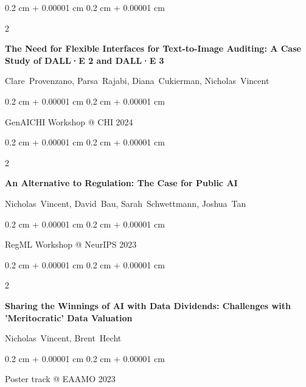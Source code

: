 \documentclass[10pt, letterpaper]{article}
\newenvironment{onecolentry}{
    \begin{adjustwidth}{
        0.2 cm + 0.00001 cm
    }{
        0.2 cm + 0.00001 cm
    }
}{
    \end{adjustwidth}
} %
\newenvironment{twocolentry}[2][]{
    \onecolentry
    \def\secondColumn{#2}
    \setcolumnwidth{\fill, 4.1 cm}
    \begin{paracol}{2}
}{
    \switchcolumn \raggedleft \secondColumn
    \end{paracol}
    \endonecolentry
} %
\begin{document}
        \begin{samepage}
            \begin{twocolentry}{
                2024
            }
                \textbf{The Need for Flexible Interfaces for Text-to-Image Auditing: A Case Study of DALL·E 2 and DALL·E 3}

                \vspace{0.10 cm}

                \mbox{Clare Provenzano}, \mbox{Parsa Rajabi}, \mbox{Diana Cukierman}, \mbox{Nicholas Vincent}
            \end{twocolentry}


            \vspace{0.10 cm}

            \begin{onecolentry}
        GenAICHI Workshop @ CHI 2024    \end{onecolentry}
        \end{samepage}

        \vspace{0.2 cm}

        \begin{samepage}
            \begin{twocolentry}{
                2023
            }
                \textbf{An Alternative to Regulation: The Case for Public AI}

                \vspace{0.10 cm}

                \mbox{Nicholas Vincent}, \mbox{David Bau}, \mbox{Sarah Schwettmann}, \mbox{Joshua Tan}
            \end{twocolentry}


            \vspace{0.10 cm}

            \begin{onecolentry}
        RegML Workshop @ NeurIPS 2023    \end{onecolentry}
        \end{samepage}

        \vspace{0.2 cm}

        \begin{samepage}
            \begin{twocolentry}{
                2023
            }
                \textbf{Sharing the Winnings of AI with Data Dividends: Challenges with 'Meritocratic' Data Valuation}

                \vspace{0.10 cm}

                \mbox{Nicholas Vincent}, \mbox{Brent Hecht}
            \end{twocolentry}


            \vspace{0.10 cm}

            \begin{onecolentry}
        Poster track @ EAAMO 2023    \end{onecolentry}
        \end{samepage}
\end{document}
